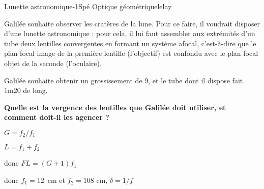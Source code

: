 \begin{exercise}{Lunette astronomique}{-1}{Spé}
{Optique géométrique}{lelay}

Galilée souhaite observer les cratères de la lune. Pour ce faire, il voudrait disposer d'une lunette astronomique : pour cela, il lui faut assembler aux extrémités d'un tube deux lentilles convergentes en formant un système afocal, c'est-à-dire que le plan focal image de la première lentille (l'objectif) est confondu avec le plan focal objet de la seconde (l'oculaire).

Galilée souhaite obtenir un grossissement de 9, et le tube dont il dispose fait 1m20 de long. 

\textbf{Quelle est la vergence des lentilles que Galilée doit utiliser, et comment doit-il les agencer ?}

\end{exercise}

\begin{solution}
    $G = f_2/f_1$
    
    $L = f_1 + f_2$
    
    donc $FL = (G+1)f_1$
    
    donc $f_1 = 12$~cm et $f_2 = 108$ cm, $\delta = 1/f$
\end{solution}